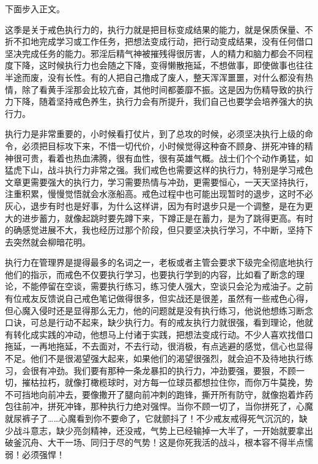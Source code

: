 下面步入正文。

这季是关于戒色执行力的，执行力就是把目标变成结果的能力，就是保质保量、不折不扣地完成学习或工作任务，把想法变成行动，把行动变成结果，没有任何借口坚决完成任务的能力。邪淫后精气神被摧残得很厉害，人的精力和脑力都会不同程度下降，这时候执行力也会随之下降，变得懒散拖延，不想做事，即使做事也往往半途而废，没有长性。有的人把自己撸成了废人，整天浑浑噩噩，对什么都没有热情，除了看黄手淫那会比较亢奋，其他时间都萎靡不振。这是因为伤精导致的执行力下降，随着坚持戒色养生，执行力会有所提升，我们自己也要学会培养强大的执行力。

执行力是非常重要的，小时候看打仗片，到了总攻的时候，必须坚决执行上级的命令，必须把目标攻下来，不惜一切代价，小时候觉得这种奋不顾身、拼死冲锋的精神很可贵，看着也热血沸腾，很有血性，很有英雄气概。战士们个个动作勇猛，如猛虎下山，战斗执行力非常之强。我们戒色也需要这样的执行力，特别是学习戒色文章更需要强大的执行力，学习需要热情与冲劲，更需要恒心，一天天坚持执行，注重积累，慢慢觉悟就会水涨船高。戒色过程中也可能出现暂时的退步，这时不必灰心，退步有时也是好事，为什么这样讲，因为有时退步只是一个调整，是在为更大的进步蓄力，就像起跳时要先蹲下来，下蹲正是在蓄力，是为了跳得更高。有时的确感觉进展不大，我也经历过那个阶段，但只要坚决执行学习，不中断，坚持下去突然就会柳暗花明。

执行力在管理界是提得最多的名词之一，老板或者主管会要求下级完全彻底地执行他们的指示，而戒色不仅要执行学习，也要执行学到的内容，比如看了断念的理论，不能停留在空谈，需要执行练习，练习使人强大，空谈只会沦为戒油子。之前有位戒友反馈说自己戒色笔记做得很多，但实战还是很差，虽然有一些戒色心得，但心魔入侵时还是显得那么无力，他的问题就是没有执行练习，他说他想练习断念口诀，可总是行动不起来，缺少执行力。有的戒友执行力就很强，看到理论，他就有转化成实践的冲动，他想马上付诸于实践，把想法变成行动。不少人喜欢找借口拖延，一再地拖延，不去面对，不去行动，很消极，有点逃避的感觉，信心也显得不足。他们不是很渴望强大起来，如果他们的渴望很强烈，就会迫不及待地执行练习，会很有冲劲。我们要有那种一条龙暴扣的执行力，冲劲要强，要狠，不顾一切，摧枯拉朽，就像打橄榄球时，对方每一位球员都想拉住你，而你万牛莫挽，势不可挡地向前冲去，要像撒开了腿向前冲刺的跑锋，撕开所有防守，就像抱着炸药包往前冲，拼死冲锋，那种执行力绝对强悍。当你不顾一切了，当你拼死了，心魔就尿裤子了……心魔看到你不要命了，它就颤抖了！不少戒友戒得死气沉沉的，缺少战斗意志，缺少亮剑精神，还没戒，气势上已经输掉一大半了，一开始就要拿出破釜沉舟、大干一场、同归于尽的气势！这是你死我活的战斗，根本容不得半点懦弱！必须强悍！

